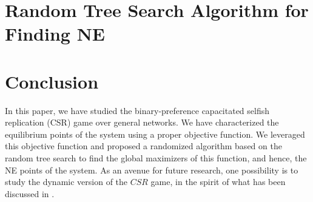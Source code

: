 \documentclass[conference, 10pt, twocolumn]{ieeeconf}
\begin{document}
\section{Random Tree Search Algorithm for Finding NE}\label{sec:apx-alg}


\section{Conclusion}\label{sec:conclusion}
In this paper, we have studied the binary-preference capacitated selfish replication (CSR) game over general networks. We have characterized the equilibrium points of the system using a proper objective function. We leveraged this objective function and proposed a randomized algorithm based on the random tree search to find the global maximizers of this function, and hence, the NE points of the system. As an avenue for future research, one possibility is to study the dynamic version of the $CSR$ game, in the spirit of what has been discussed in \cite{fabrikant2003network}.



\end{document}
